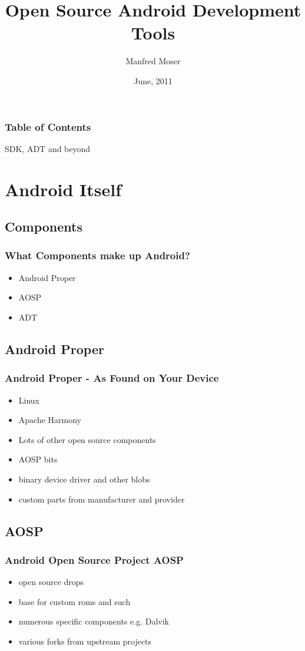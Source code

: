 \documentclass{beamer}
\title{Open Source Android Development Tools}
\author{Manfred Moser}
\date{June, 2011}
\institute[2011]{simpligility technologies inc.}
\begin{document}
\begin{frame}
  \titlepage 
\end{frame}

\begin{frame}
  \frametitle{Table of Contents}
  SDK, ADT and beyond
  \setcounter{tocdepth}{1}
  \tableofcontents
\end{frame}


\section{Android Itself}

  \subsection{Components}
    \begin{frame}
      \frametitle{What Components make up Android?}
      \begin{itemize}
        \item<1->Android Proper
        \item<2->AOSP
        \item<3->ADT
      \end{itemize}
    \end{frame}

  \subsection{Android Proper}
    \begin{frame}
    \frametitle{Android Proper - As Found on Your Device}
    \begin{itemize}
      \item<1->Linux
      \item<2->Apache Harmony 
      \item<3->Lots of other open source components
      \item<4->AOSP bits
      \item<5->binary device driver and other blobs 
      \item<6->custom parts from manufacturer and provider
    \end{itemize}
    \end{frame}
  
  \subsection{AOSP}
    \begin{frame}
      \frametitle{Android Open Source Project AOSP}
      \begin{itemize}
        \item<1->open source drops
        \item<2->base for custom roms and such
        \item<3->numerous specific components e.g. Dalvik
        \item<4->various forks from upstream projects
      \end{itemize}
    \end{frame}
\end{document}
